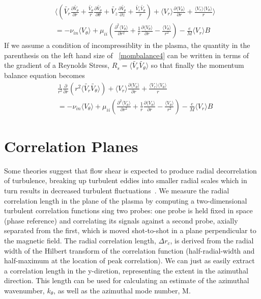 \documentclass[aip,pop,amsmath,amssymb,preprint,superscriptaddress]{revtex4-1} %
\begin{document}
\begin{equation}
\begin{aligned}
&\biggl \langle \left(\tilde{V_r}\frac{\partial \tilde{V_{\theta}}}{\partial r}+\frac{\tilde{V_{\theta}}}{r}\frac{\partial \tilde{V_{\theta}}}{\partial \theta}+\tilde{V_z}\frac{\partial \tilde{V_{\theta}}}{\partial z}+\frac{\tilde{V_r}\tilde{V_{\theta}}}{r}\right)+\langle V_r \rangle \frac{\partial \langle V_{\theta} \rangle}{\partial r}+\frac{\langle V_r \rangle \langle V_{\theta}\rangle}{r}\biggr\rangle\\
&=-\nu_{in}\langle V_{\theta}\rangle + \mu_{ii}\left(\frac{\partial^{2}\langle V_{\theta}\rangle}{\partial r^2}+\frac{1}{r}\frac{\partial \langle V_{\theta}\rangle}{\partial r}-\frac{\langle V_{\theta}\rangle}{r^2}\right)-\frac{e}{M}\langle V_r \rangle B
\end{aligned}
\label{eq:mombalance4}
\end{equation}
If we assume a condition of incompressiblity in the plasma, the quantity in the parenthesis on the left hand size of ~\ref{mombalance4} can be written in terms of the gradient of a Reynolds Stress, $R_s = \langle \tilde{V_r} \tilde{V_{\theta}}\rangle$ so that finally the momentum balance equation becomes
\begin{equation}
\begin{aligned}
&\frac{1}{r^2}\frac{\partial}{\partial r}(r^2\langle \tilde{V_r} \tilde{V_{\theta}}\rangle)+\langle V_r \rangle \frac{\partial \langle V_{\theta} \rangle}{\partial r}+\frac{\langle V_r \rangle \langle V_{\theta}\rangle}{r}\\
&=-\nu_{in}\langle V_{\theta}\rangle + \mu_{ii}\left(\frac{\partial^{2}\langle V_{\theta}\rangle}{\partial r^2}+\frac{1}{r}\frac{\partial \langle V_{\theta}\rangle}{\partial r}-\frac{\langle V_{\theta}\rangle}{r^2}\right)-\frac{e}{M}\langle V_r \rangle B
\end{aligned}
\label{eq:mombalance5}
\end{equation}


\section{Correlation Planes}

Some theories suggest that flow shear is expected to produce radial decorrelation of turbulence,
breaking up turbulent eddies into smaller radial scales which in turn results in decreased turbulent fluctuations~\cite{biglari90}.
We measure the radial correlation length in the plane of the plasma by computing a two-dimensional turbulent correlation functions sing
two probes: one probe is held fixed in space (phase reference) and
correlating its signals against a second probe, axially separated
from the first, which is moved shot-to-shot in a plane perpendicular
to the magnetic field.  The radial correlation length, $\Delta r_c$,
is derived from the radial width of the Hilbert transform of the
correlation function (half-radial-width and half-maximum at the
location of peak correlation). We can just as easily extract a correlation length in the y-diretion, representing the extent in the azimuthal direction. This length can be used for calculating an estimate of the azimuthal wavenumber, $k_{\theta}$, as well as the azimuthal mode number, M.
\end{document}
